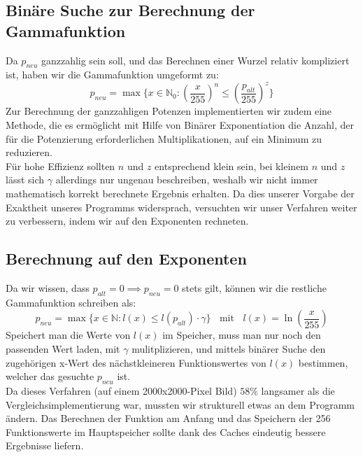 \documentclass[course=erap]{aspdoc}
\begin{document}
	\subsection{Binäre Suche zur Berechnung der Gammafunktion}
	Da $p_{neu}$ ganzzahlig sein soll, und das Berechnen einer Wurzel relativ kompliziert ist, haben wir die Gammafunktion umgeformt zu:
	\begin{equation}
	p_{neu} = \max \{ x \in \mathbb{N}_{0} : \left(\frac{x}{255}\right)^{n} \leq \left(\frac{p_{alt}}{255}\right)^{z} \}
	\end{equation}
	\noindent
	Zur Berechnung der ganzzahligen Potenzen implementierten wir zudem eine Methode, die es ermöglicht mit Hilfe von Binärer Exponentiation die Anzahl, der für die Potenzierung erforderlichen Multiplikationen, auf ein Minimum zu reduzieren.\\

	\noindent
	Für hohe Effizienz sollten $n$ und $z$ entsprechend klein sein, bei kleinem $n$ und $z$ lässt sich $\gamma$ allerdings nur ungenau beschreiben, weshalb wir nicht immer mathematisch korrekt berechnete Ergebnis erhalten. Da dies unserer Vorgabe der Exaktheit unseres Programms widersprach, versuchten wir unser Verfahren weiter zu verbessern, indem wir auf den Exponenten rechneten.

	\subsection{Berechnung auf den Exponenten}
	Da wir wissen, dass $p_{alt}=0 \implies p_{neu}=0$ stets gilt, können wir die restliche Gammafunktion schreiben als:
	\begin{equation}
	    p_{neu} = \max\{x\in \mathbb{N} : l(x) \leq l(p_{alt}) \cdot \gamma\} \;\;\text{ mit } \;\; l(x) = \ln\left(\frac{x}{255}\right)
	\end{equation}
	Speichert man die Werte von $l(x)$ im Speicher, muss man nur noch den passenden Wert laden, mit $\gamma$ mulitplizieren, und mittels binärer Suche den zugehörigen x-Wert des nächstkleineren Funktionswertes von $l(x)$ bestimmen, welcher das gesuchte $p_{neu}$ ist.\\

	\noindent
	Da dieses Verfahren (auf einem 2000x2000-Pixel Bild) $58\%$ langsamer als die Vergleichsimplementierung war, mussten wir strukturell etwas an dem Programm ändern. Das Berechnen der Funktion am Anfang und das Speichern der 256 Funktionswerte im Hauptspeicher sollte dank des Caches eindeutig bessere Ergebnisse liefern.\\
\end{document}
